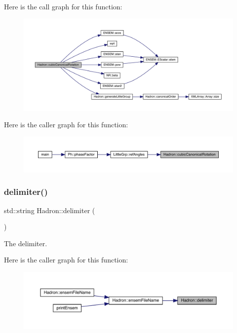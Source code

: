 Here is the call graph for this function\+:
\nopagebreak
\begin{figure}[H]
\begin{center}
\leavevmode
\includegraphics[width=350pt]{d1/daf/namespaceHadron_ada689173e1553ad2f452af24028eae2f_cgraph}
\end{center}
\end{figure}
Here is the caller graph for this function\+:
\nopagebreak
\begin{figure}[H]
\begin{center}
\leavevmode
\includegraphics[width=350pt]{d1/daf/namespaceHadron_ada689173e1553ad2f452af24028eae2f_icgraph}
\end{center}
\end{figure}
\mbox{\label{namespaceHadron_a2ea4a74b346adec57d30f2605fc00005}} 
\subsubsection{\texorpdfstring{delimiter()}{delimiter()}}
{\footnotesize\ttfamily std\+::string Hadron\+::delimiter (\begin{DoxyParamCaption}{ }\end{DoxyParamCaption})}



The delimiter. 

Here is the caller graph for this function\+:
\nopagebreak
\begin{figure}[H]
\begin{center}
\leavevmode
\includegraphics[width=350pt]{d1/daf/namespaceHadron_a2ea4a74b346adec57d30f2605fc00005_icgraph}
\end{center}
\end{figure}
\mbox{\label{namespaceHadron_a5851b4dcb78567e53c44241a6db6c87e}} 
